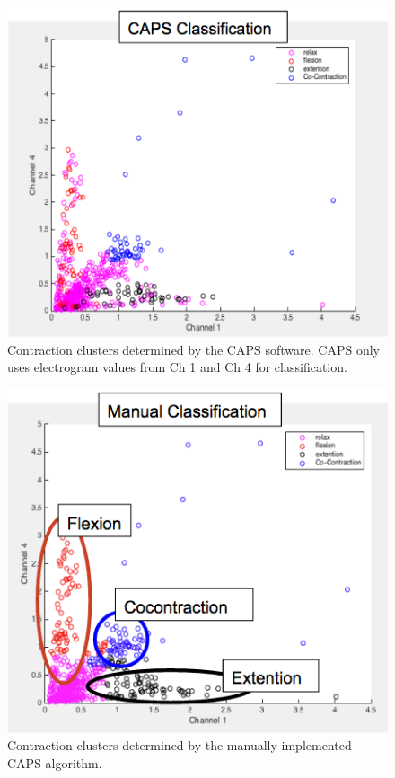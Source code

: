 \documentclass[times, 10pt,twocolumn]{article}
\begin{document}
\begin{figure}
  \includegraphics[width=\linewidth]{Figures/f3.png}
  \caption{Contraction clusters determined by the CAPS software. CAPS only uses electrogram values from Ch 1 and Ch 4 for classification.}
  \label{fig:caps_clusters}
\end{figure}

\begin{figure}
  \includegraphics[width=\linewidth]{Figures/f4.png}
  \caption{Contraction clusters determined by the manually implemented CAPS algorithm.}
  \label{fig:manual_clusters}
\end{figure}
\end{document}

